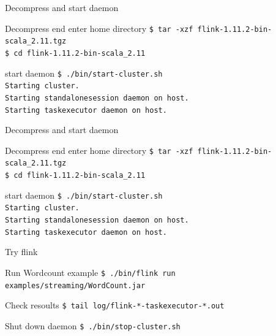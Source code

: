 \documentclass[blue]{beamer}
\begin{document}
\begin{frame}{Decompress and start daemon}

\begin{block}{Decompress end enter home directory}
{\tt \$   tar -xzf flink-1.11.2-bin-scala_2.11.tgz\\
\$ cd flink-1.11.2-bin-scala_2.11}
\end{block}
\begin{block}{start daemon}
{\tt    \$ ./bin/start-cluster.sh\\
Starting cluster.\\
Starting standalonesession daemon on host.\\
Starting taskexecutor daemon on host.}
\end{block}
\end{frame}

\begin{frame}{Decompress and start daemon}

\begin{block}{Decompress end enter home directory}
{\tt \$   tar -xzf flink-1.11.2-bin-scala_2.11.tgz\\
\$ cd flink-1.11.2-bin-scala_2.11}
\end{block}
\begin{block}{start daemon}
{\tt    \$ ./bin/start-cluster.sh\\
Starting cluster.\\
Starting standalonesession daemon on host.\\
Starting taskexecutor daemon on host.}
\end{block}
\end{frame}


\begin{frame}{Try flink}

\begin{block}{Run Wordcount example}
{\tt \$ ./bin/flink run examples/streaming/WordCount.jar}
\end{block}
\begin{block}{Check resoults}
{\tt  \$  tail log/flink-*-taskexecutor-*.out}
\end{block}

\begin{block}{Shut down daemon }
{\tt  \$ ./bin/stop-cluster.sh}
\end{block}
\end{frame}
\end{document}
